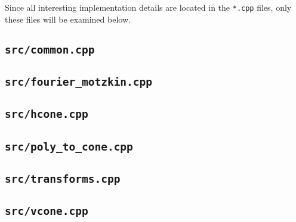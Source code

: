 \documentclass[fleqn]{article}
\newcommand{\0}{\vec{0}}
\begin{document}
Since all interesting implementation details are located in the \texttt{*.cpp} files, only these files will be examined below.

\subsection{\texttt{src/common.cpp}}
\subsection{\texttt{src/fourier\_motzkin.cpp}}
\subsection{\texttt{src/hcone.cpp}}
\subsection{\texttt{src/poly\_to\_cone.cpp}}
\subsection{\texttt{src/transforms.cpp}}
\subsection{\texttt{src/vcone.cpp}}
\end{document}
